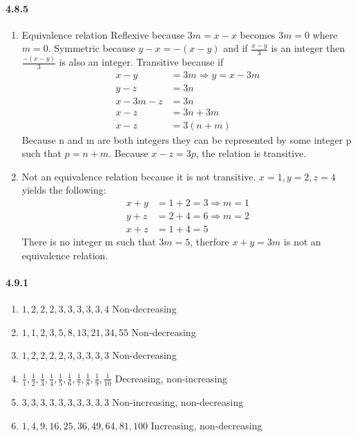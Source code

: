 \documentclass[11pt, letterpaper, twocolumn, fleqn]{article}
\begin{document}
    \paragraph{4.8.5}
        \begin{enumerate}
            \item Equivalence relation \newline
                Reflexive because $3m=x-x$ becomes $3m=0$ where $m=0$. \newline
                Symmetric because $y-x = -(x-y)$ and if $\frac{x-y}{3}$ is an integer then $\frac{-(x-y)}{3}$ is also an integer. \newline
                Transitive because if
                \begin{align*}
                 x-y &=3m \Rightarrow y=x-3m \\
                 y-z &= 3n \\
                 x-3m-z &= 3n \\
                 x-z &= 3n+3m  \\
                 x-z &= 3(n+m)
                \end{align*}
                Because n and m are both integers they can be represented by some integer p such that $p=n+m$. Because $x-z=3p$, the relation is transitive.
            \item Not an equivalence relation because it is not transitive.  $x=1, y=2, z=4$ yields the following:
                \begin{align*}
                 x+y&=1+2=3 \Rightarrow m=1 \\
                 y+z&=2+4=6 \Rightarrow m=2 \\
                 x+z&=1+4=5 
                \end{align*}
                There is no integer m such that $3m=5$, therfore $x+y=3m$ is not an equivalence relation.
        \end{enumerate}
    
    \paragraph{4.9.1}
        \begin{enumerate}
            \item $1,2,2,2,3,3, 3, 3, 3, 4$ Non-decreasing
            \item $1,1,2,3,5,8,13,21,34,55$ Non-decreasing
            \item $1,2,2,2,2,3, 3, 3, 3, 3$ Non-decreasing
            \item $\frac{1}{1},
                   \frac{1}{2},
                   \frac{1}{3},
                   \frac{1}{4},
                   \frac{1}{5},
                   \frac{1}{6},
                   \frac{1}{7},
                   \frac{1}{8},
                   \frac{1}{9},
                   \frac{1}{10}$ Decreasing, non-increasing
            \item $3,3,3,3,3,3,3,3,3,3$ Non-increasing, non-decreasing
            \item $1,4,9,16,25,36,49,64,81,100$ Increasing, non-decreasing
        \end{enumerate}
    
\end{document}
